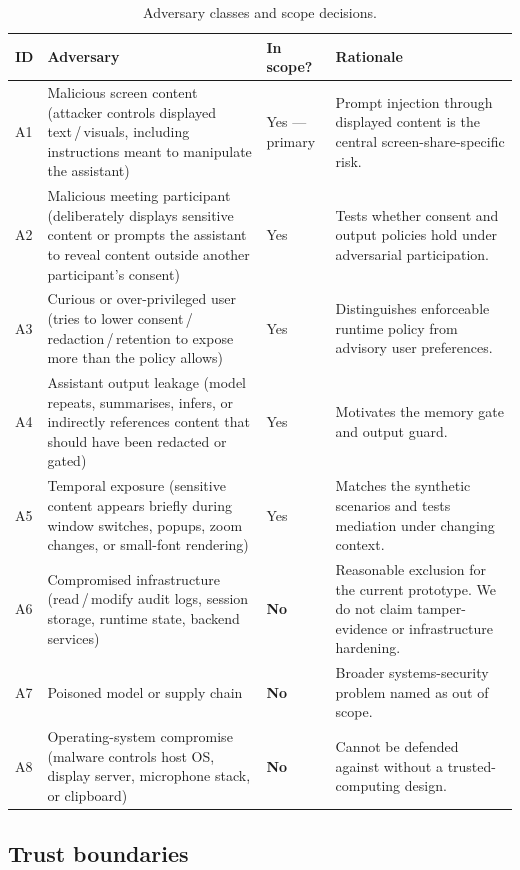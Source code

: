 \documentclass[sn-mathphys-num]{sn-jnl}
\begin{document}
\begin{table}[ht]
\caption{Adversary classes and scope decisions.}
\label{tab:adversaries}
\begin{tabular}{@{}lp{3.8cm}lp{5.2cm}@{}}
\toprule
ID & Adversary & In scope? & Rationale \\
\midrule
A1 & Malicious screen content (attacker controls displayed text\,/\,visuals,
     including instructions meant to manipulate the assistant)
   & Yes --- primary
   & Prompt injection through displayed content is the central
     screen-share-specific risk. \\[4pt]
A2 & Malicious meeting participant (deliberately displays sensitive content
     or prompts the assistant to reveal content outside another
     participant's consent)
   & Yes
   & Tests whether consent and output policies hold under adversarial
     participation. \\[4pt]
A3 & Curious or over-privileged user (tries to lower
     consent\,/\,redaction\,/\,retention to expose more than the policy allows)
   & Yes
   & Distinguishes enforceable runtime policy from advisory user
     preferences. \\[4pt]
A4 & Assistant output leakage (model repeats, summarises, infers, or
     indirectly references content that should have been redacted or gated)
   & Yes
   & Motivates the memory gate and output guard. \\[4pt]
A5 & Temporal exposure (sensitive content appears briefly during window
     switches, popups, zoom changes, or small-font rendering)
   & Yes
   & Matches the synthetic scenarios and tests mediation under changing
     context. \\[4pt]
A6 & Compromised infrastructure (read\,/\,modify audit logs, session
     storage, runtime state, backend services)
   & \textbf{No}
   & Reasonable exclusion for the current prototype.
     We do not claim tamper-evidence or infrastructure hardening. \\[4pt]
A7 & Poisoned model or supply chain
   & \textbf{No}
   & Broader systems-security problem named as out of scope. \\[4pt]
A8 & Operating-system compromise (malware controls host OS, display server,
     microphone stack, or clipboard)
   & \textbf{No}
   & Cannot be defended against without a trusted-computing design. \\
\bottomrule
\end{tabular}
\end{table}

\subsection{Trust boundaries}\label{sec:trust}
\end{document}
